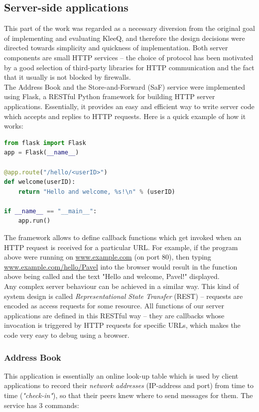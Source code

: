 \documentclass[a4paper, 12pt]{report}
\begin{document}
\subsection{Server-side applications}
This part of the work was regarded as a necessary diversion from the original goal of implementing and evaluating KleeQ, and therefore the design decisions were directed towards simplicity and quickness of implementation. Both server components are small HTTP services -- the choice of protocol has been motivated by a good selection of third-party libraries for HTTP communication and the fact that it usually is not blocked by firewalls.\\

The Address Book and the Store-and-Forward (SaF) service were implemented using Flask, a RESTful Python framework for building HTTP server applications. Essentially, it provides an easy and efficient way to write server code which accepts and replies to HTTP requests. Here is a quick example of how it works: \\

\begin{lstlisting}[language = Python, columns=fullflexible]
from flask import Flask
app = Flask(__name__)

@app.route("/hello/<userID>")
def welcome(userID):
    return "Hello and welcome, %s!\n" % (userID)
    
if __name__ == "__main__":
    app.run()
\end{lstlisting}


The framework allows to define callback functions which get invoked when an HTTP request is received for a particular URL. For example, if the program above were running on \url{www.example.com} (on port 80), then typing \url{www.example.com/hello/Pavel} into the browser would result in the function above being called and the text "Hello and welcome, Pavel!" displayed. \\

Any complex server behaviour can be achieved in a similar way. This kind of system design is called \emph{Representational State Transfer} (REST) -- requests are encoded as access requests for some resource.  All functions of our server applications are defined in this RESTful way -- they are callbacks whose invocation is triggered by HTTP requests for specific URLs, which makes the code very easy to debug using a browser.

\subsubsection{Address Book}
This application is essentially an online look-up table which is used by client applications to record their \emph{network addresses} (IP-address and port) from time to time (\emph{"check-in"}), so that their peers knew where to send messages for them. The service has 3 commands:
\end{document}
